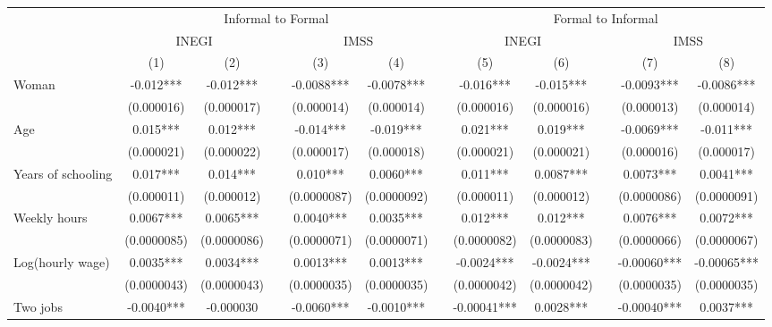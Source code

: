 \begin{tabular}{lccccccccccc}
\toprule
      & \multicolumn{5}{c}{Informal to Formal } &       & \multicolumn{5}{c}{Formal to Informal} \\
\cmidrule{2-6}\cmidrule{8-12}      & \multicolumn{2}{c}{INEGI} &       & \multicolumn{2}{c}{IMSS} &       & \multicolumn{2}{c}{INEGI} &       & \multicolumn{2}{c}{IMSS} \\
\cmidrule{2-3}\cmidrule{5-6}\cmidrule{8-9}\cmidrule{11-12}      & (1)   & (2)   &       & (3)   & (4)   &       & (5)   & (6)   &       & (7)   & (8) \\
\midrule
\midrule
Woman & -0.012*** & -0.012*** &       & -0.0088*** & -0.0078*** &       & -0.016*** & -0.015*** &       & -0.0093*** & -0.0086*** \\
      & (0.000016) & (0.000017) &       & (0.000014) & (0.000014) &       & (0.000016) & (0.000016) &       & (0.000013) & (0.000014) \\
Age   & 0.015*** & 0.012*** &       & -0.014*** & -0.019*** &       & 0.021*** & 0.019*** &       & -0.0069*** & -0.011*** \\
      & (0.000021) & (0.000022) &       & (0.000017) & (0.000018) &       & (0.000021) & (0.000021) &       & (0.000016) & (0.000017) \\
Years of schooling & 0.017*** & 0.014*** &       & 0.010*** & 0.0060*** &       & 0.011*** & 0.0087*** &       & 0.0073*** & 0.0041*** \\
      & (0.000011) & (0.000012) &       & (0.0000087) & (0.0000092) &       & (0.000011) & (0.000012) &       & (0.0000086) & (0.0000091) \\
Weekly hours & 0.0067*** & 0.0065*** &       & 0.0040*** & 0.0035*** &       & 0.012*** & 0.012*** &       & 0.0076*** & 0.0072*** \\
      & (0.0000085) & (0.0000086) &       & (0.0000071) & (0.0000071) &       & (0.0000082) & (0.0000083) &       & (0.0000066) & (0.0000067) \\
Log(hourly wage) & 0.0035*** & 0.0034*** &       & 0.0013*** & 0.0013*** &       & -0.0024*** & -0.0024*** &       & -0.00060*** & -0.00065*** \\
      & (0.0000043) & (0.0000043) &       & (0.0000035) & (0.0000035) &       & (0.0000042) & (0.0000042) &       & (0.0000035) & (0.0000035) \\
Two jobs & -0.0040*** & -0.000030 &       & -0.0060*** & -0.0010*** &       & -0.00041*** & 0.0028*** &       & -0.00040*** & 0.0037*** \\

\end{tabular}
